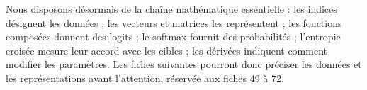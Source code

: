 Nous disposons désormais de la chaîne mathématique essentielle :
les indices désignent les données ; les vecteurs et matrices
les représentent ; les fonctions composées donnent des logits ;
le softmax fournit des probabilités ; l'entropie croisée
mesure leur accord avec les cibles ; les dérivées indiquent
comment modifier les paramètres. Les fiches suivantes pourront
donc préciser les données et les représentations avant
l'attention, réservée aux fiches 49 à 72.

